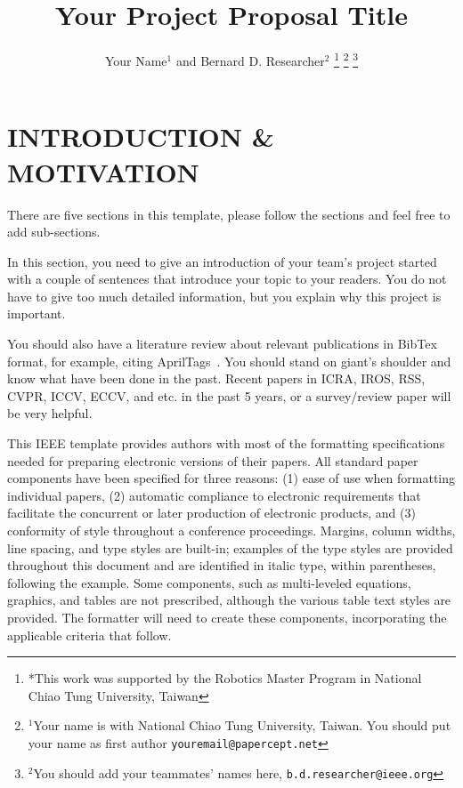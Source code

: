 \documentclass[letterpaper, 10 pt, conference]{ieeeconf}  %
\title{\LARGE \bf
Your Project Proposal Title
}
\author{Your Name$^{1}$ and Bernard D. Researcher$^{2}$%
\thanks{*This work was supported by the Robotics Master Program in National Chiao Tung University, Taiwan}%
\thanks{$^{1}$Your name is with National Chiao Tung University, Taiwan. You should put your name as first author
        {\tt\small youremail@papercept.net}}%
\thanks{$^{2}$You should add your teammates' names here,
        {\tt\small b.d.researcher@ieee.org}}%
}
\begin{document}
\maketitle
\thispagestyle{empty}
\pagestyle{empty}

\section{INTRODUCTION \& MOTIVATION}

There are five sections in this template, please follow the sections and feel free to add sub-sections. 

In this section, you need to give an introduction of your team's project started with a couple of sentences that introduce your topic to your readers. You do not have to give too much detailed information, but you explain why this project is important.

You should also have a literature review about relevant publications in BibTex format, for example, citing AprilTags~\cite{Olson09icra}. You should stand on giant's shoulder and know what have been done in the past. Recent papers in ICRA, IROS, RSS, CVPR, ICCV, ECCV, and etc. in the past 5 years, or a survey/review paper will be very helpful.

This IEEE template provides authors with most of the formatting specifications needed for preparing electronic versions of their papers. All standard paper components have been specified for three reasons: (1) ease of use when formatting individual papers, (2) automatic compliance to electronic requirements that facilitate the concurrent or later production of electronic products, and (3) conformity of style throughout a conference proceedings. Margins, column widths, line spacing, and type styles are built-in; examples of the type styles are provided throughout this document and are identified in italic type, within parentheses, following the example. Some components, such as multi-leveled equations, graphics, and tables are not prescribed, although the various table text styles are provided. The formatter will need to create these components, incorporating the applicable criteria that follow.
\end{document}
